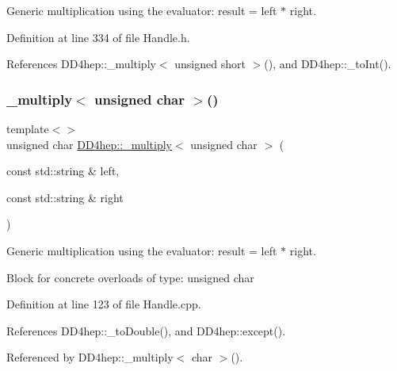 Generic multiplication using the evaluator\+: result = left $\ast$ right. 



Definition at line 334 of file Handle.\+h.



References D\+D4hep\+::\+\_\+multiply$<$ unsigned short $>$(), and D\+D4hep\+::\+\_\+to\+Int().

\hypertarget{group___d_d4_h_e_p___g_e_o_m_e_t_r_y_ga73881557b7a3e4e7b05ec0dcdb04a2ef}{}\label{group___d_d4_h_e_p___g_e_o_m_e_t_r_y_ga73881557b7a3e4e7b05ec0dcdb04a2ef} 
\subsubsection{\texorpdfstring{\+\_\+multiply$<$ unsigned char $>$()}{\_multiply< unsigned char >()}\hspace{0.1cm}{\footnotesize\ttfamily [1/3]}}
{\footnotesize\ttfamily template$<$$>$ \\
unsigned char \hyperlink{group___d_d4_h_e_p___g_e_o_m_e_t_r_y_gab860c2299e2eb50e537c5079fb0c9c51}{D\+D4hep\+::\+\_\+multiply}$<$ unsigned char $>$ (\begin{DoxyParamCaption}\item[{const std\+::string \&}]{left,  }\item[{const std\+::string \&}]{right }\end{DoxyParamCaption})}



Generic multiplication using the evaluator\+: result = left $\ast$ right. 

Block for concrete overloads of type\+: unsigned char 

Definition at line 123 of file Handle.\+cpp.



References D\+D4hep\+::\+\_\+to\+Double(), and D\+D4hep\+::except().



Referenced by D\+D4hep\+::\+\_\+multiply$<$ char $>$().

\hypertarget{group___d_d4_h_e_p___g_e_o_m_e_t_r_y_ga2fa2d1960c014daf990c65fcdf882712}{}\label{group___d_d4_h_e_p___g_e_o_m_e_t_r_y_ga2fa2d1960c014daf990c65fcdf882712} 
